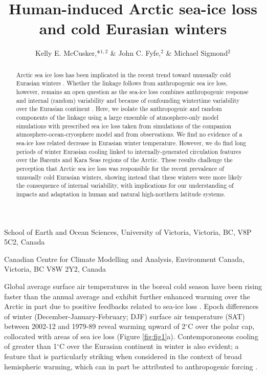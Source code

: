 \documentclass{nature}
\title{Human-induced Arctic sea-ice loss and cold Eurasian winters}
\author{Kelly E. McCusker,*$^{1,2}$ \& John C. Fyfe,$^{2}$ \& Michael Sigmond$^2$}
\begin{document}
\maketitle

\begin{affiliations}
 \item School of Earth and Ocean Sciences, University of Victoria, Victoria, BC, V8P 5C2, Canada
 \item Canadian Centre for Climate Modelling and Analysis, Environment Canada, Victoria, BC V8W 2Y2, Canada
\end{affiliations}


\begin{abstract}
Arctic sea ice loss has been implicated in the recent trend toward unusually cold Eurasian winters \cite{liu12,mori14,kim14}. Whether the linkage follows from anthropogenic sea ice loss, however, remains an open question as the sea-ice loss combines anthropogenic response and internal (random) variability \cite{swart15,wettstein14} and because of confounding wintertime variability over the Eurasian continent \cite{deser12b,screen14a}. Here, we isolate the anthropogenic and random components of the linkage using a large ensemble of atmosphere-only model simulations with prescribed sea ice loss taken from simulations of the companion atmosphere-ocean-cryosphere model and from observations. We find no evidence of a sea-ice loss related decrease in Eurasian winter temperature. However, we do find long periods of winter Eurasian cooling linked to internally-generated circulation features over the Barents and Kara Seas regions of the Arctic. These results challenge the perception that Arctic sea ice loss was responsible for the recent prevalence of unusually cold Eurasian winters, showing instead that these winters were more likely the consequence of internal variability, with implications for our understanding of impacts and adaptation in human and natural high-northern latitude systems. %
\end{abstract}

Global average surface air temperatures in the boreal cold season have been rising faster than the annual average \cite{wallace12} and exhibit further enhanced warming over the Arctic in part due to positive feedbacks related to sea-ice loss \cite{screen10,cohen14}. Epoch differences of winter (December-January-February; DJF) surface air temperature (SAT) between 2002-12 and 1979-89 reveal warming upward of 2$^\circ$C over the polar cap, collocated with areas of sea ice loss (Figure \ref{fig:fig1}a). Contemporaneous cooling of greater than 1$^\circ$C over the Eurasian continent in winter is also evident; a feature that is particularly striking when considered in the context of broad hemispheric warming, which can in part be attributed to anthropogenic forcing \cite{gillett08,qian15}. %
\end{document}
